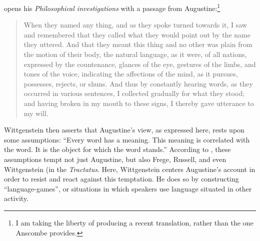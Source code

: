 \documentclass[man,12pt,natbib]{apa6}
\begin{document}
\citet{Wittgenstein53} opens his \emph{Philosophical investigations} with a
passage from Augustine:\footnote{I am taking the liberty of producing a recent
translation, rather than the one Anscombe provides.}
\begin{quote}
	When they named any thing, and as they spoke turned towards it, I saw and
	remembered that they called what they would point out by the name they
	uttered. And that they meant this thing and no other was plain from the
	motion of their body, the natural language, as it were, of all nations,
	expressed by the countenance, glances of the eye, gestures of the limbs,
	and tones of the voice, indicating the affections of the mind, as it
	pursues, possesses, rejects, or shuns. And thus by constantly hearing
	words, as they occurred in various sentences, I collected gradually for
	what they stood; and having broken in my mouth to these signs, I thereby
	gave utterance to my will. \citep[\S 1.8.13]{Pusey09}
\end{quote}
Wittgenstein then asserts that Augustine's view, as expressed here,
rests upon some assumptions: ``Every word has a meaning. This meaning is
correlated with the word. It is the object for which the word stands.''
According to \citet{McGinn97}, these assumptions tempt not just Augustine, but
also Frege, Russell, and even Wittgenstein (in the \emph{Tractatus}. 
Here, Wittgenstein centers 
Augustine's account in order to resist and react against
this temptation. He does so by constructing ``language-games'', or situations
in which speakers use language situated in other activity.
\end{document}
